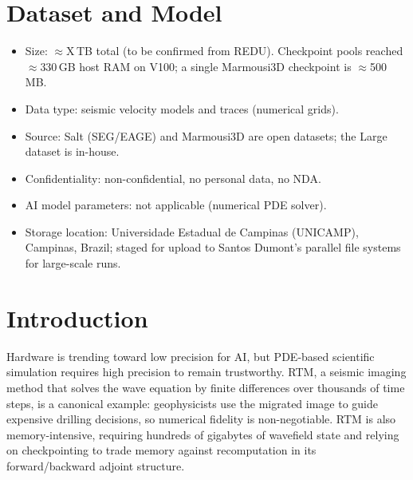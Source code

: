\documentclass[12pt,a4paper]{article}
\begin{document}
\section{Dataset and Model}

\begin{itemize}
  \item Size: $\approx$X\,TB total (to be confirmed from REDU). Checkpoint pools
        reached $\approx$330\,GB host RAM on V100; a single Marmousi3D checkpoint
        is $\approx$500\,MB.
  \item Data type: seismic velocity models and traces (numerical grids).
  \item Source: Salt (SEG/EAGE) and Marmousi3D are open datasets; the Large
        dataset is in-house.
  \item Confidentiality: non-confidential, no personal data, no NDA.
  \item AI model parameters: not applicable (numerical PDE solver).
  \item Storage location: Universidade Estadual de Campinas (UNICAMP), Campinas,
        Brazil; staged for upload to Santos Dumont's parallel file systems for
        large-scale runs.
\end{itemize}

\fi

\iffalse

\section{Introduction}

Hardware is trending toward low precision for AI, but PDE-based scientific
simulation requires high precision to remain trustworthy. RTM, a seismic imaging
method that solves the wave equation by finite differences over thousands of
time steps, is a canonical example: geophysicists use the migrated image to
guide expensive drilling decisions, so numerical fidelity is non-negotiable. RTM
is also memory-intensive, requiring hundreds of gigabytes of wavefield state and
relying on checkpointing to trade memory against recomputation in its
forward/backward adjoint structure.
\end{document}
